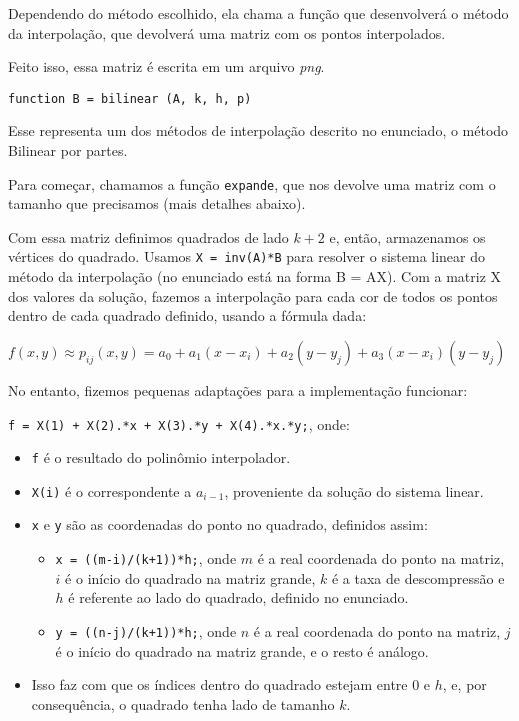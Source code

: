 \documentclass[12pt,letterpaper]{article}
\begin{document}
        Dependendo do método escolhido, ela chama a função que desenvolverá o método da interpolação, que devolverá uma matriz com os pontos interpolados.

        Feito isso, essa matriz é escrita em um arquivo \textit{png}.

        \begin{center}
            \texttt{function B = bilinear (A, k, h, p)}
        \end{center}

        Esse representa um dos métodos de interpolação descrito no enunciado, o método Bilinear por partes.

        Para começar, chamamos a função \texttt{expande}, que nos devolve uma matriz com o tamanho que precisamos (mais detalhes abaixo).

        Com essa matriz definimos quadrados de lado $k+2$ e, então, armazenamos os vértices do quadrado. Usamos \texttt{X = inv(A)*B} para resolver o sistema linear do método da interpolação (no enunciado está na forma B = AX). Com a matriz X dos valores da solução, fazemos a interpolação para cada cor de todos os pontos dentro de cada quadrado definido, usando a fórmula dada:

        \begin{center}
            $f(x, y) \approx p_{ij} (x, y) = a_0 + a_1(x - x_i ) + a_2 (y - y_j ) + a_3 (x - x_i )(y - y_j)$
        \end{center}

        No entanto, fizemos pequenas adaptações para a implementação funcionar:

        \begin{center}
            \texttt{f = X(1) + X(2).*x + X(3).*y + X(4).*x.*y;}, onde:
        \end{center}

        \begin{itemize}
            \item \texttt{f} é o resultado do polinômio interpolador.
            \item \texttt{X(i)} é o correspondente a $a_{i-1}$, proveniente da solução do sistema linear.
            \item \texttt{x} e \texttt{y} são as coordenadas do ponto no quadrado, definidos assim:
            \begin{itemize}
                \item \texttt{x = ((m-i)/(k+1))*h;}, onde $m$ é a real coordenada do ponto na matriz, $i$ é o início do quadrado na matriz grande, $k$ é a taxa de descompressão e $h$ é referente ao lado do quadrado, definido no enunciado.
                \item \texttt{y = ((n-j)/(k+1))*h;}, onde $n$ é a real coordenada do ponto na matriz, $j$ é o início do quadrado na matriz grande, e o resto é análogo.
            \end{itemize}
            \item Isso faz com que os índices dentro do quadrado estejam entre 0 e $h$, e, por consequência, o quadrado tenha lado de tamanho $k$.
        \end{itemize}
\end{document}
